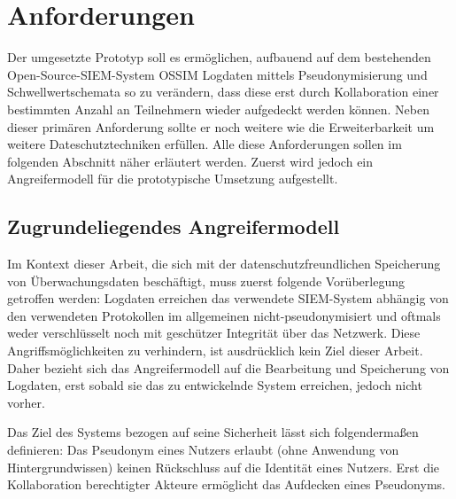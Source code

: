 \section{Anforderungen}

\label{sec_impl_requirements}

Der umgesetzte Prototyp soll es ermöglichen, aufbauend auf dem bestehenden Open-Source-SIEM-System OSSIM Logdaten mittels Pseudonymisierung und Schwellwertschemata so zu verändern, dass diese erst durch Kollaboration einer bestimmten Anzahl an Teilnehmern wieder aufgedeckt werden können. Neben dieser primären Anforderung sollte er noch weitere wie die Erweiterbarkeit um weitere Dateschutztechniken erfüllen. Alle diese Anforderungen sollen im folgenden Abschnitt näher erläutert werden. Zuerst wird jedoch ein Angreifermodell für die prototypische Umsetzung aufgestellt.

\subsection*{Zugrundeliegendes Angreifermodell}


Im Kontext dieser Arbeit, die sich mit der datenschutzfreundlichen Speicherung von Überwachungsdaten beschäftigt, muss zuerst folgende Vorüberlegung getroffen werden: Logdaten erreichen das verwendete SIEM-System abhängig von den verwendeten Protokollen im allgemeinen nicht-pseudonymisiert und oftmals weder verschlüsselt noch mit geschützer Integrität über das Netzwerk. 
Diese Angriffsmöglichkeiten zu verhindern, ist ausdrücklich kein Ziel dieser Arbeit. Daher bezieht sich das Angreifermodell auf die Bearbeitung und Speicherung von Logdaten, erst sobald sie das zu entwickelnde System erreichen, jedoch nicht vorher.

Das Ziel des Systems bezogen auf seine Sicherheit lässt sich folgendermaßen definieren: Das Pseudonym eines Nutzers erlaubt (ohne Anwendung von Hintergrundwissen) keinen Rückschluss auf die Identität eines Nutzers. Erst die Kollaboration berechtigter Akteure ermöglicht das Aufdecken eines Pseudonyms.

